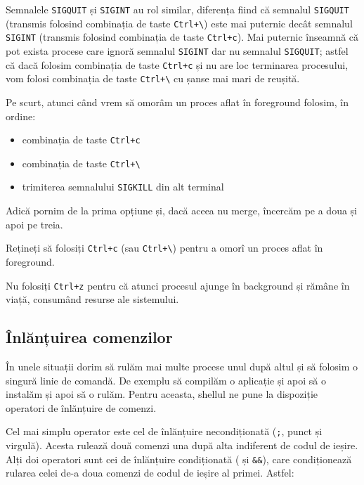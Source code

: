 Semnalele \texttt{SIGQUIT} și \texttt{SIGINT} au rol similar, diferența fiind că semnalul \texttt{SIGQUIT}
(transmis folosind combinația de taste \texttt{Ctrl+\textbackslash{}}) este mai puternic
decât semnalul \texttt{SIGINT} (transmis folosind combinația de taste \texttt{Ctrl+c}). Mai
puternic înseamnă că pot exista procese care ignoră semnalul \texttt{SIGINT} dar nu
semnalul \texttt{SIGQUIT}; astfel că dacă folosim combinația de taste \texttt{Ctrl+c} și nu are
loc terminarea procesului, vom folosi combinația de taste \texttt{Ctrl+\textbackslash{}}
cu șanse mai mari de reușită.

Pe scurt, atunci când vrem să omorâm un proces aflat în foreground folosim, în
ordine:

\begin{itemize}
  \item combinația de taste \texttt{Ctrl+c}
  \item combinația de taste \texttt{Ctrl+\textbackslash{}}
  \item trimiterea semnalului \texttt{SIGKILL} din alt terminal
\end{itemize}

Adică pornim de la prima opțiune și, dacă aceea nu merge, încercăm pe a doua și
apoi pe treia.

\begin{note}
Rețineți să folosiți \texttt{Ctrl+c} (sau \texttt{Ctrl+\textbackslash{}}) pentru a omorî un proces aflat în foreground.

Nu folosiți \texttt{Ctrl+z} pentru că atunci procesul ajunge în background și rămâne în
viață, consumând resurse ale sistemului.
\end{note}

\subsection{Înlănțuirea comenzilor}
\label{sec:process:command-chaining}

În unele situații dorim să rulăm mai multe procese unul după altul și să folosim
o singură linie de comandă. De exemplu să compilăm o aplicație și apoi să o
instalăm și apoi să o rulăm. Pentru aceasta, shellul ne pune la dispoziție
operatori de înlănțuire de comenzi.

Cel mai simplu operator este cel de înlănțuire necondiționată (\texttt{;}, punct și virgulă). Acesta
rulează două comenzi una după alta indiferent de codul de ieșire. Alți doi
operatori sunt cei de înlănțuire condiționată (\texttt{\textbar{}\textbar{}} și \texttt{\&\&}), care condiționează rularea celei
de-a doua comenzi de codul de ieșire al primei. Astfel:

